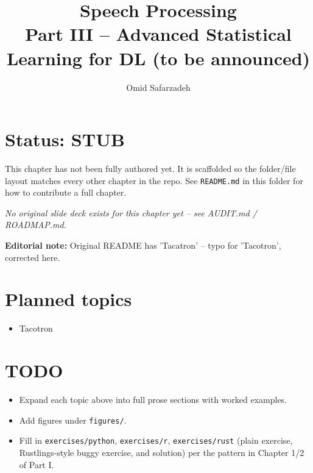 \documentclass[11pt]{article}
\title{Speech Processing \\ \large Part III -- Advanced Statistical Learning for DL (to be announced)}
\author{Omid Safarzadeh}
\date{}
\begin{document}
\maketitle

\section*{Status: STUB}
This chapter has not been fully authored yet. It is scaffolded so the
folder/file layout matches every other chapter in the repo. See
\texttt{README.md} in this folder for how to contribute a full chapter.

\textit{No original slide deck exists for this chapter yet -- see AUDIT.md / ROADMAP.md.}

\par\noindent\textbf{Editorial note:} Original README has 'Tacatron' -- typo for 'Tacotron', corrected here.

\section*{Planned topics}
\begin{itemize}
  \item Tacotron
\end{itemize}

\section*{TODO}
\begin{itemize}
  \item Expand each topic above into full prose sections with worked examples.
  \item Add figures under \texttt{figures/}.
  \item Fill in \texttt{exercises/python}, \texttt{exercises/r}, \texttt{exercises/rust}
        (plain exercise, Rustlings-style buggy exercise, and solution) per the
        pattern in Chapter 1/2 of Part I.
\end{itemize}
\end{document}
